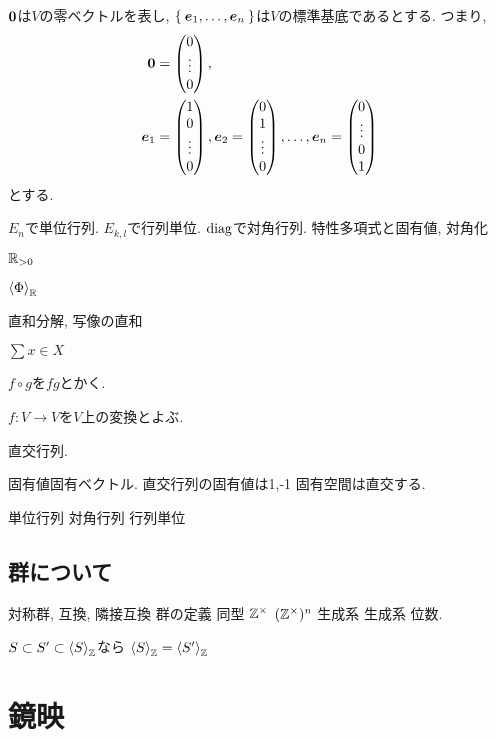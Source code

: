 $\boldsymbol{0}$は$V$の零ベクトルを表し,
$\Set{\boldsymbol{e}_1,\ldots,\boldsymbol{e}_n}$は$V$の標準基底であるとする.
つまり,
\begin{align*}
 \boldsymbol{0}&=\begin{pmatrix}0\\\vdots\\0\end{pmatrix},\\
 \boldsymbol{e}_1&=\begin{pmatrix}1\\0\\\vdots\\0\end{pmatrix},
 \boldsymbol{e}_2=\begin{pmatrix}0\\1\\\vdots\\0\end{pmatrix},
 \ldots,
 \boldsymbol{e}_n=\begin{pmatrix}0\\\vdots\\0\\1\end{pmatrix}
\end{align*}
とする.

$E_n$で単位行列.
$E_{k,l}$で行列単位.
$\operatorname{diag}$で対角行列.
特性多項式と固有値, 対角化

$\mathbb{R}_{>0}$

$\Braket{\Phi}_{\mathbb{R}}$

直和分解, 写像の直和

$\sum{x\in X}$

$f\circ g$を$fg$とかく.

$f\colon V\to V$を$V$上の変換とよぶ.

直交行列.

固有値固有ベクトル.
直交行列の固有値は1,-1
固有空間は直交する.

単位行列
対角行列
行列単位

\section{群について}
対称群, 互換, 隣接互換
群の定義
同型
$\mathbb{Z}^{\times}$ $(\mathbb{Z}^{\times})^n$ 生成系
生成系
位数.

$S\subset S' \subset \Braket{S}_{\mathbb{Z}}$なら
$\Braket{S}_{\mathbb{Z}}=\Braket{S'}_{\mathbb{Z}}$

\chapter{鏡映}

